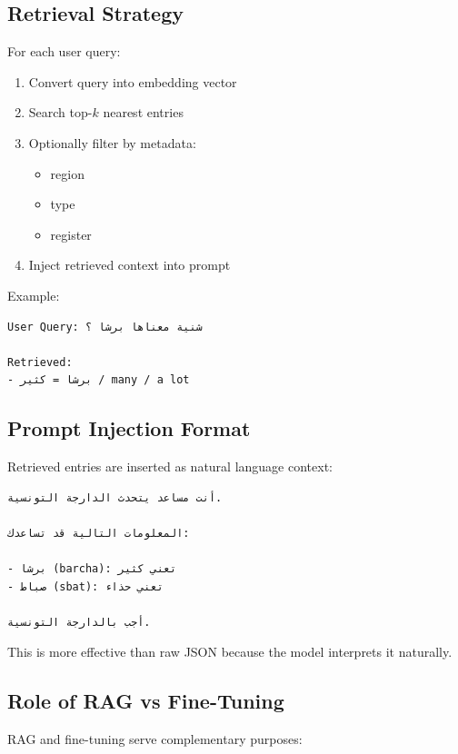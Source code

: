 \documentclass[12pt,a4paper]{report}
\begin{document}
\subsection{Retrieval Strategy}

For each user query:

\begin{enumerate}
    \item Convert query into embedding vector
    \item Search top-$k$ nearest entries
    \item Optionally filter by metadata:
    \begin{itemize}
        \item region
        \item type
        \item register
    \end{itemize}
    \item Inject retrieved context into prompt
\end{enumerate}

Example:

\begin{verbatim}
User Query: شنية معناها برشا ؟

Retrieved:
- برشا = كثير / many / a lot
\end{verbatim}

\subsection{Prompt Injection Format}

Retrieved entries are inserted as natural language context:

\begin{verbatim}
أنت مساعد يتحدث الدارجة التونسية.

المعلومات التالية قد تساعدك:

- برشا (barcha): تعني كثير
- صباط (sbat): تعني حذاء

أجب بالدارجة التونسية.
\end{verbatim}

This is more effective than raw JSON because the model interprets it naturally.

\subsection{Role of RAG vs Fine-Tuning}

RAG and fine-tuning serve complementary purposes:
\end{document}
